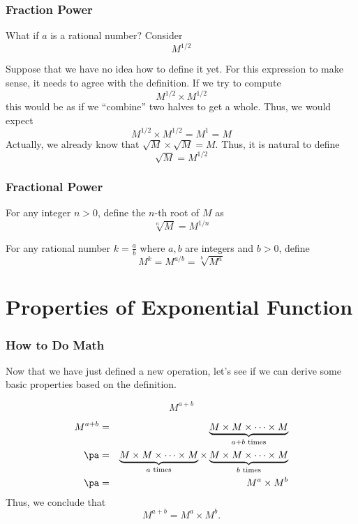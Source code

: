 \begin{frame}[t]
  \frametitle{Fraction Power}
  What if $a$ is a rational number? Consider
  \[M^{1/2}\]
  \begin{slide}
    Suppose that we have no idea how to define it yet. For this expression to make sense, it needs to agree with the definition. If we try to compute
    \[M^{1/2} \times M^{1/2}\]
    this would be as if we ``combine'' two halves to get a whole. Thus, we would expect
    \[M^{1/2} \times M^{1/2} = M^1 = M\]
    Actually, we already know that $\sqrt{M} \times \sqrt{M} = M$. Thus, it is natural to define
    \[\sqrt{M} = M^{1/2}\]
  \end{slide}
\end{frame}

\begin{frame}
  \frametitle{Fractional Power}
  \begin{defn}{}{}
    For any integer $n > 0$, define the $n$-th root of $M$ as
    \[\sqrt[n]{M} = M^{1/n}\]
    \tcblower

    For any rational number $k= \frac{a}{b}$ where $a,b$ are integers and $b > 0$, define
    \[ M^k = M^{a/b} = \sqrt[b]{M^a}\]
  \end{defn}
\end{frame}

\section[Properties]{Properties of Exponential Function}
\frame{\sectionpage}

\begin{frame}[t]
  \frametitle{How to Do Math}
  Now that we have just defined a new operation, let's see if we can derive some basic properties based on the definition.
  \begin{block}{}
    \[ M^{a+b}\]
  \end{block}
  \begin{slide}
    \begin{eqnarray*}
      M^{a+b} &=& \underbrace{M \times M \times \cdots \times M}_{a+b \text{ times}} \\ \pa
      &=& \underbrace{M \times M \times \cdots \times M}_{a \text{ times}} \times \underbrace{M \times M \times \cdots \times M}_{b \text{ times}} \\ \pa
      &=& M^a \times M^b
    \end{eqnarray*}
    Thus, we conclude that
    \[M^{a+b} = M^a \times M^b.\]
  \end{slide}
\end{frame}

